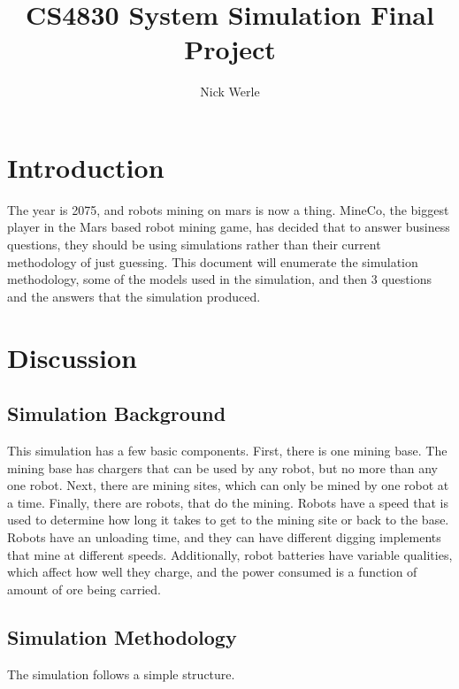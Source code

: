 \documentclass{article}
\title{CS4830 System Simulation Final Project}
\author{Nick Werle}
\begin{document}
\maketitle
\newpage
\tableofcontents
\newpage
\section{Introduction}
The year is 2075, and robots mining on mars is now a thing.
MineCo, the biggest player in the Mars based robot mining game, has decided that to answer business questions, they should be using simulations rather than their current methodology of just guessing.
This document will enumerate the simulation methodology, some of the models used in the simulation, and then 3 questions and the answers that the simulation produced.

\section{Discussion}
\subsection{Simulation Background}
This simulation has a few basic components.
First, there is one mining base.
The mining base has chargers that can be used by any robot, but no more than any one robot.
Next, there are mining sites, which can only be mined by one robot at a time.
Finally, there are robots, that do the mining.
Robots have a speed that is used to determine how long it takes to get to the mining site or back to the base.
Robots have an unloading time, and they can have different digging implements that mine at different speeds.
Additionally, robot batteries have variable qualities, which affect how well they charge, and the power consumed is a function of amount of ore being carried.

\subsection{Simulation Methodology}
The simulation follows a simple structure.
\end{document}
